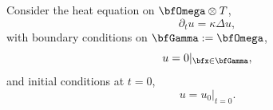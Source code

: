 

    \line
    
    \begin{example}
        Consider the heat equation on $\bfOmega\otimes T$,
        \begin{equation}\label{eqn:FEs in time PDE}
            \partial_{t}u  =  \kappa\Delta u,
        \end{equation}
        with boundary conditions on $\bfGamma  :=  \bfOmega$,
        \begin{equation}\label{eqn:FEs in time BC}
            u  =  0|_{\bfx \in \bfGamma},
        \end{equation}
        and initial conditions at $t  =  0$,
        \begin{equation}\label{eqn:FEs in time IC}
            u  =  u_{0}|_{t = 0}.
        \end{equation}
        

\end{example}
